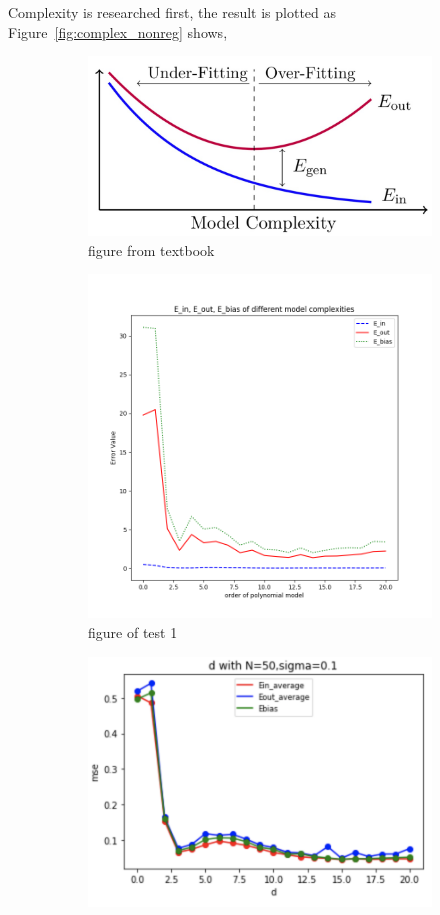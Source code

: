 \documentclass[12pt,letterpaper]{article}
\begin{document}
Complexity is researched first, the result is plotted as Figure~\ref{fig:complex_nonreg} shows,
\begin{figure}[h]
\centering
\begin{subfigure}{.45\textwidth}
  \centering
  \includegraphics[width=.9\linewidth]{d_txtbook.jpg}
  \caption{\small figure from textbook}
  \label{fig:sub1}
\end{subfigure}%
\begin{subfigure}{.45\textwidth}
  \centering
  \includegraphics[width=.9\linewidth]{test_d_noreg.png}
  \caption{\small figure of test 1}
  \label{fig:sub2}
\end{subfigure}
\begin{subfigure}{.55\textwidth}
  \centering
  \includegraphics[width=.9\linewidth]{lzd50sig01.png}

\end{subfigure}
\end{figure}
\end{document}
